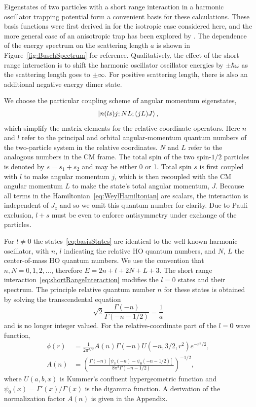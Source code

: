 \documentclass[%
 notitlepage,
 preprint,
showpacs,%
 amsmath,amssymb,
 aps,
pra,
]{revtex4-1}
\begin{document}
Eigenstates of two particles with a short range interaction in a harmonic oscillator trapping potential form a convenient basis for these calculations. These basis functions were first derived in \cite{Busch} for the isotropic case considered here, and the more general case of an anisotropic trap has been explored by \cite{PhysRevA.74.022712}. The dependence of the energy spectrum on the scattering length $a$ is shown in Figure~\ref{fig:BuschSpectrum} for reference. Qualitatively, the effect of the short-range interaction is to shift the harmonic oscillator oscillator energies by $\pm \hbar\omega$ as the scattering length goes to $\pm \infty$. For positive scattering length, there is also an additional negative energy dimer state.

We choose the particular coupling scheme of angular momentum eigenstates,
\begin{equation}\label{eq:basisStates}
\ket{n(ls)j;NL;(jL)J},
\end{equation}
which simplify the matrix elements for the relative-coordinate operators. Here $n$ and $l$ refer to the principal and orbital angular-momentum quantum numbers of the two-particle system in the relative coordinates. $N$ and $L$ refer to the analogous numbers in the CM frame. The total spin of the two spin-$1/2$ particles is denoted by $s = s_1 + s_2$ and may be either 0 or 1. Total spin $s$ is first coupled with $l$ to make angular momentum $j$, which is then recoupled with the CM angular momentum $L$ to make the state's total angular momentum, $J$. Because all terms in the Hamiltonian~\eqref{eq:WeylHamiltonian} are scalars, the interaction is independent of $J_z$ and so we omit this quantum number for clarity. Due to Pauli exclusion, $l + s$ must be even to enforce antisymmetry under exchange of the particles.

For $l\neq0$ the states~\eqref{eq:basisStates} are identical to the well known harmonic oscillator, with $n$, $l$ indicating the relative HO quantum numbers, and $N$, $L$ the center-of-mass HO quantum numbers. We use the convention that $n,N=0,1,2,\dots$, therefore $E=2n+l+2N+L+3$. The short range interaction~\eqref{eq:shortRangeInteraction} modifies the $l=0$ states and their spectrum. The principle relative quantum number $n$ for these states is obtained by solving the transcendental equation
\begin{equation}\label{eq:eigenvalueEqn}
\sqrt{2}\frac{\Gamma(-n)}{\Gamma(-n-1/2)}=\frac{1}{a}
\end{equation}
and is no longer integer valued. For the relative-coordinate part of the $l=0$ wave function,
\begin{align}
\phi(r)&=\frac{1}{2\pi^{3/2}}A(n)\Gamma(-n)U(-n,3/2,r^2)e^{-r^2/2}, \label{eq:BuschWF}\\
A(n)&=\left(\frac{\Gamma(-n)[\psi_0(-n)-\psi_0(-n-1/2)]}{8 \pi^2 \Gamma(-n-1/2)}\right)^{-1/2},
\end{align}
where $U(a,b,x)$ is Kummer's confluent hypergeometric function and $\psi_0(x)=\Gamma'(x)/\Gamma(x)$ is the digamma function. A derivation of the normalization factor $A(n)$ is given in the Appendix.
\end{document}
